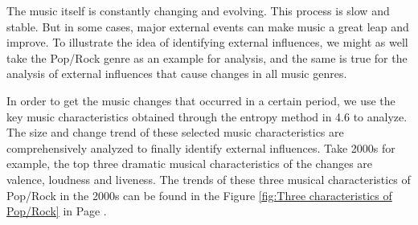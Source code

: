 \documentclass[12pt]{article}  %
\begin{document}
The music itself is constantly changing and evolving. This process is slow and stable. But in some cases, major external events can make music a great leap and improve. To illustrate the idea of identifying external influences, we might as well take the Pop/Rock genre as an example for analysis, and the same is true for the analysis of external influences that cause changes in all music genres.\par

In order to get the music changes that occurred in a certain period, we use the key music characteristics obtained through the entropy method in 4.6 to analyze. The size and change trend of these selected music characteristics are comprehensively analyzed to finally identify external influences. Take 2000s for example, the top three dramatic musical characteristics of the changes are valence, loudness and liveness. The trends of these three musical characteristics of Pop/Rock in the 2000s can be found in the Figure \ref{fig:Three characteristics of Pop/Rock} in Page \pageref{fig:Three characteristics of Pop/Rock}. 
\end{document}
